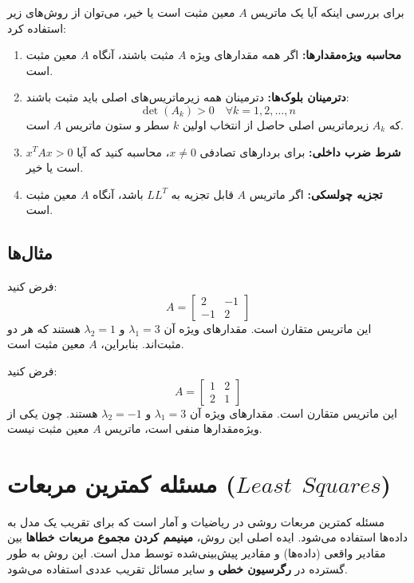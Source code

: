 برای بررسی اینکه آیا یک ماتریس \( A \) معین مثبت است یا خیر، می‌توان از روش‌های زیر استفاده کرد:
\begin{enumerate}
	\item \textbf{محاسبه ویژه‌مقدارها:}
	اگر همه مقدارهای ویژه \( A \) مثبت باشند، آنگاه \( A \) معین مثبت است.
	
	\item \textbf{دترمینان بلوک‌ها:}
	دترمینان همه زیرماتریس‌های اصلی باید مثبت باشند:
	\[
	\det(A_k) > 0 \quad \forall k = 1, 2, \ldots, n
	\]
	که \( A_k \) زیرماتریس اصلی حاصل از انتخاب اولین \( k \) سطر و ستون ماتریس \( A \) است.
	
	\item \textbf{شرط ضرب داخلی:}
	برای بردارهای تصادفی \( x \neq 0 \)، محاسبه کنید که آیا \( x^T A x > 0 \) است یا خیر.
	
	\item \textbf{تجزیه چولسکی:}
	اگر ماتریس \( A \) قابل تجزیه به \( L L^T \) باشد، آنگاه \( A \) معین مثبت است.
\end{enumerate}

\subsection{مثال‌ها}

\begin{example}
	فرض کنید:
	\[
	A = \begin{bmatrix}
		2 & -1 \\
		-1 & 2
	\end{bmatrix}
	\]
	این ماتریس متقارن است. مقدارهای ویژه آن \( \lambda_1 = 3 \) و \( \lambda_2 = 1 \) هستند که هر دو مثبت‌اند.  
	بنابراین، \( A \) معین مثبت است.
\end{example}
\begin{example}
	فرض کنید:
	\[
	A = \begin{bmatrix}
		1 & 2 \\
		2 & 1
	\end{bmatrix}
	\]
	این ماتریس متقارن است.  
	مقدارهای ویژه آن \( \lambda_1 = 3 \) و \( \lambda_2 = -1 \) هستند.  
	چون یکی از ویژه‌مقدارها منفی است، ماتریس \( A \) معین مثبت نیست.
\end{example}


\section{مسئله کمترین مربعات ($Least ~~Squares$)}

مسئله کمترین مربعات روشی در ریاضیات و آمار است که برای تقریب یک مدل به داده‌ها استفاده می‌شود. ایده اصلی این روش، \textbf{مینیمم کردن مجموع مربعات خطاها} بین مقادیر واقعی (داده‌ها) و مقادیر پیش‌بینی‌شده توسط مدل است. این روش به طور گسترده در \textbf{رگرسیون خطی} و سایر مسائل تقریب عددی استفاده می‌شود.

